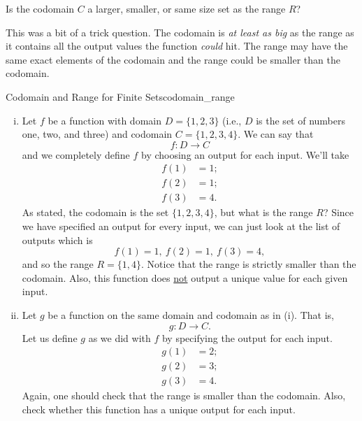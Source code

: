     \begin{question}
    Is the codomain $C$ a larger, smaller, or same size set as the range $R$?
    \end{question}

    \begin{answer}
    This was a bit of a trick question.  The codomain is \emph{at least as big} as the range as it contains all the output values the function \emph{could} hit.  The range may have the same exact elements of the codomain and the range could be smaller than the codomain.
    \end{answer}

    \begin{ex}{Codomain and Range for Finite Sets}{codomain_range}
    \begin{enumerate}[(i)]
        \item Let $f$ be a function with domain $D=\{1,2,3\}$ (i.e., $D$ is the set of numbers one, two, and three) and codomain $C=\{1,2,3,4\}$. We can say that
    \[
    f\colon D \to C
    \]
    and we completely define $f$ by choosing an output for each input. We'll take
    \begin{align*}
        f(1)&=1;\\
        f(2)&=1;\\
        f(3)&=4.
    \end{align*}
    As stated, the codomain is the set $\{1,2,3,4\}$, but what is the range $R$? Since we have specified an output for every input, we can just look at the list of outputs which is
    \[
    f(1)=1,~f(2)=1,~f(3)=4,
    \]
    and so the range $R=\{1,4\}$.  Notice that the range is strictly smaller than the codomain. Also, this function does \underline{not} output a unique value for each given input.

        \item Let $g$ be a function on the same domain and codomain as in (i). That is,
        \[
        g\colon D \to C.
        \]
        Let us define $g$ as we did with $f$ by specifying the output for each input.
        \begin{align*}
            g(1)&=2;\\
            g(2)&=3;\\
            g(3)&=4.
        \end{align*}
        Again, one should check that the range is smaller than the codomain. Also, check whether this function has a unique output for each input.
    \end{enumerate}
    \end{ex}

